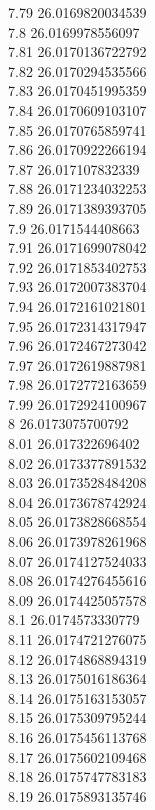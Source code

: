 {7.79	26.0169820034539\\
7.8	26.0169978556097\\
7.81	26.0170136722792\\
7.82	26.0170294535566\\
7.83	26.0170451995359\\
7.84	26.0170609103107\\
7.85	26.0170765859741\\
7.86	26.0170922266194\\
7.87	26.017107832339\\
7.88	26.0171234032253\\
7.89	26.0171389393705\\
7.9	26.0171544408663\\
7.91	26.0171699078042\\
7.92	26.0171853402753\\
7.93	26.0172007383704\\
7.94	26.0172161021801\\
7.95	26.0172314317947\\
7.96	26.0172467273042\\
7.97	26.0172619887981\\
7.98	26.0172772163659\\
7.99	26.0172924100967\\
8	26.0173075700792\\
8.01	26.017322696402\\
8.02	26.0173377891532\\
8.03	26.0173528484208\\
8.04	26.0173678742924\\
8.05	26.0173828668554\\
8.06	26.0173978261968\\
8.07	26.0174127524033\\
8.08	26.0174276455616\\
8.09	26.0174425057578\\
8.1	26.0174573330779\\
8.11	26.0174721276075\\
8.12	26.0174868894319\\
8.13	26.0175016186364\\
8.14	26.0175163153057\\
8.15	26.0175309795244\\
8.16	26.0175456113768\\
8.17	26.0175602109468\\
8.18	26.0175747783183\\
8.19	26.0175893135746\\
}
